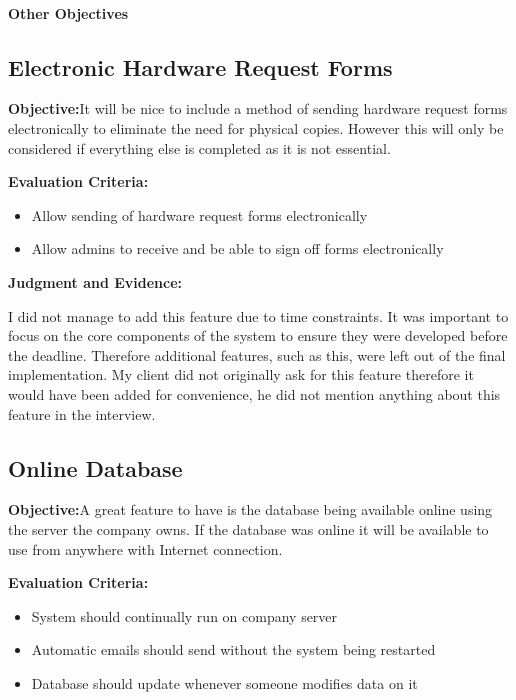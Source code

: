 \paragraph{Other Objectives}

\subsection{Electronic Hardware Request Forms}

\textbf{Objective:}It will be nice to include a method of sending hardware request forms electronically to eliminate the need for physical copies. However this will only be considered if everything else is completed as it is not essential.

\textbf{Evaluation Criteria:}
\begin{itemize}
\item{Allow sending of hardware request forms electronically}
\item{Allow admins to receive and be able to sign off forms electronically}
\end{itemize}

\textbf{Judgment and Evidence:}

I did not manage to add this feature due to time constraints. It was important to focus on the core components of the system to ensure they were developed before the deadline. Therefore additional features, such as this, were left out of the final implementation. My client did not originally ask for this feature therefore it would have been added for convenience, he did not mention anything about this feature in the interview.

\subsection{Online Database}

\textbf{Objective:}A great feature to have is the database being available online using the server the company owns. If the database was online it will be available to use from anywhere with Internet connection.

\textbf{Evaluation Criteria:}
\begin{itemize}
\item{System should continually run on company server}
\item{Automatic emails should send without the system being restarted}
\item{Database should update whenever someone modifies data on it}
\end{itemize}

